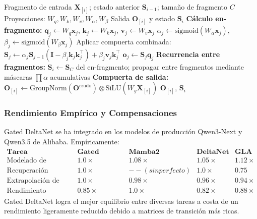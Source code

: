 \begin{algorithm}[H]
\caption{Paso Adelante Paralelo por Fragmentos de Gated DeltaNet}
\begin{algorithmic}[1]
\Require Fragmento de entrada $\mathbf{X}_{[i]}$; estado anterior $\mathbf{S}_{i-1}$; tamaño de fragmento $C$
\Require Proyecciones: $W_q, W_k, W_v, W_\alpha, W_\beta$
\Ensure Salida $\mathbf{O}_{[i]}$ y estado $\mathbf{S}_i$
\State \textbf{Cálculo en-fragmento:}
    \State $\mathbf{q}_j \gets W_q \mathbf{x}_j$, $\mathbf{k}_j \gets W_k \mathbf{x}_j$, $\mathbf{v}_j \gets W_v \mathbf{x}_j$
    \State $\alpha_j \gets \text{sigmoid}(W_\alpha \mathbf{x}_j)$, $\beta_j \gets \text{sigmoid}(W_\beta \mathbf{x}_j)$
    \State Aplicar compuerta combinada: $\mathbf{S}_j \gets \alpha_j \mathbf{S}_{j-1}(\mathbf{I} - \beta_j \mathbf{k}_j \mathbf{k}_j^\top) + \beta_j \mathbf{v}_j \mathbf{k}_j^\top$
    \State $\mathbf{o}_j \gets \mathbf{S}_j \mathbf{q}_j$
\EndFor
\State \textbf{Recurrencia entre fragmentos:}
\State $\mathbf{S}_i \gets \mathbf{S}_C$ del en-fragmento; propagar entre fragmentos mediante máscaras $\prod \alpha$ acumulativas
\State \textbf{Compuerta de salida:} $\mathbf{O}_{[i]} \gets \text{GroupNorm}(\mathbf{O}^\text{crudo}) \otimes \text{SiLU}(W_g \mathbf{X}_{[i]})$
\Return $\mathbf{O}_{[i]}$, $\mathbf{S}_i$
\end{algorithmic}
\end{algorithm}

\subsubsection{Rendimiento Empírico y Compensaciones}

Gated DeltaNet se ha integrado en los modelos de producción Qwen3-Next y Qwen3.5 de Alibaba. Empíricamente:
\[
\begin{array}{l|cccc}
\textbf{Tarea} & \textbf{Gated DeltaNet} & \textbf{Mamba2} & \textbf{DeltaNet} & \textbf{GLA} \\
\hline
\text{Modelado de Lenguaje} & \mathbf{1.0\times} & 1.08\times & 1.05\times & 1.12\times \\
\text{Recuperación Asociativa} & \mathbf{1.0\times} & --(sin perfecto) & \mathbf{1.0\times} & 0.75 \\
\text{Extrapolación de Longitud} & \mathbf{1.0\times} & 0.98\times & 0.96\times & 0.94\times \\
\text{Rendimiento (tokens/seg)} & 0.85\times & \mathbf{1.0\times} & 0.82\times & 0.88\times
\end{array}
\]
Gated DeltaNet logra el mejor equilibrio entre diversas tareas a costa de un rendimiento ligeramente reducido debido a matrices de transición más ricas.

